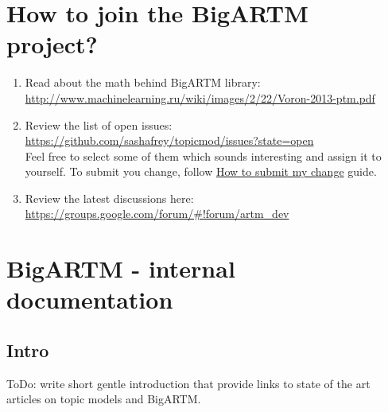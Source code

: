 \documentclass[11pt,a4paper,twoside]{report}
\begin{document}
\tableofcontents

\chapter{How to join the BigARTM project?}
\begin{enumerate}
\item Read about the math behind BigARTM library: \\ \url{http://www.machinelearning.ru/wiki/images/2/22/Voron-2013-ptm.pdf}
\item Review the list of open issues: \\
    \url{https://github.com/sashafrey/topicmod/issues?state=open}\\
    Feel free to select some of them which sounds interesting and assign it to yourself.
    To submit you change, follow \hyperref[label:how_to_submit]{How to submit my change} guide.
\item Review the latest discussions here: \\
    \url{https://groups.google.com/forum/#!forum/artm_dev}
\end{enumerate}

\chapter{BigARTM - internal documentation}

\section{Intro}
ToDo: write short gentle introduction that provide links to state of the art articles on topic models and BigARTM.
\end{document}
